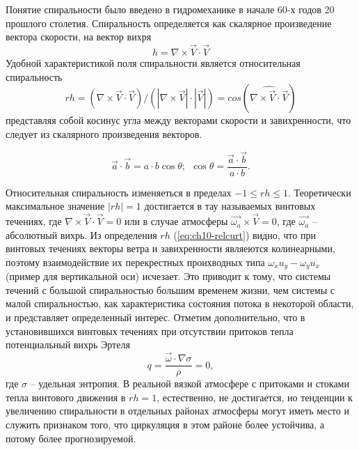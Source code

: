 Понятие спиральности было введено в гидромеханике в начале 60-х годов 20 прошлого столетия. Спиральность определяется как скалярное произведение вектора скорости, на вектор вихря
\begin{equation}
    \label{eq:ch10-curt}
    h = \nabla\times\vec{V}\cdot\vec{V}
\end{equation}
Удобной характеристикой поля спиральности является относительная спиральность
\begin{equation}
    \label{eq:ch10-relcurt}
    rh= (\nabla\times\vec{V}\cdot\vec{V})/( |\nabla\times\vec{V}| \cdot |\vec{V}| )= cos{ ( \widehat{ \nabla\times\vec{V}\cdot\vec{V} } ) }
\end{equation}
представляя собой косинус угла между векторами скорости и завихренности, что следует из скалярного произведения векторов.
\begin{info}
    \begin{equation*}
        \vec{a} \cdot \vec{b} = a \cdot b \cos{\theta}; \:\: \cos{\theta} = \frac{\vec{a} \cdot \vec{b}}{a \cdot b}.
    \end{equation*}
\end{info}
Относительная спиральность изменяеться в пределах $-1\leq rh \leq 1$. Теоретически максимальное значение $| rh | = 1$ достигается в тау называемых винтовых течениях, где $\nabla\times\vec{V}\cdot\vec{V}=0$ или в случае атмосферы $\vec{\omega_a}\times\vec{V}=0$, где $\vec{\omega_a}$ -- абсолютный вихрь. Из определения $rh$ (\ref{eq:ch10-relcurt}) видно, что при винтовых течениях векторы ветра и завихренности являеются колинеарными, поэтому взаимодействие их перекрестных проихводных типа $\omega_x u_y - \omega_y u_x$ (пример для вертикальной оси) исчезает. Это приводит к тому, что системы течений с большой спиральностью б\textit{о}льшим временем жизни, чем системы с малой спиральностью, как характеристика состояния потока в некоторой области, и представляет определенный интерес. Отметим дополнительно, что в установившихся винтовых течениях при отсутствии притоков тепла потенциальный вихрь Эртеля
\begin{equation*}
    q=\frac{\vec{\omega}\cdot\nabla\sigma}{\rho} = 0,
\end{equation*}
где $\sigma$ -- удельная энтропия. В реальной вязкой атмосфере с притоками и стоками тепла винтового движения в $rh=1$, естественно, не достигается, но тенденции к увеличению спиральности в отдельных районах атмосферы могут иметь место и служить признаком того, что циркуляция в этом районе более устойчива, а потому более прогнозируемой.

